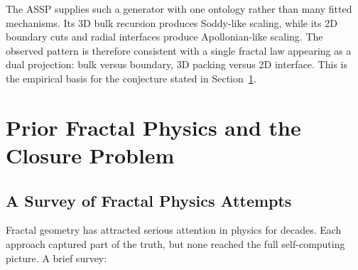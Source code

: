 \documentclass[11pt,a4paper]{article}
\begin{document}
The ASSP supplies such a generator with one ontology rather than many fitted mechanisms. Its 3D bulk recursion produces Soddy-like scaling, while its 2D boundary cuts and radial interfaces produce Apollonian-like scaling. The observed pattern is therefore consistent with a single fractal law appearing as a dual projection: bulk versus boundary, 3D packing versus 2D interface. This is the empirical basis for the conjecture stated in Section~\ref{sec:conjecture}.


\section{Prior Fractal Physics and the Closure Problem}
\label{sec:conjecture}

\subsection{A Survey of Fractal Physics Attempts}

Fractal geometry has attracted serious attention in physics for decades. Each approach captured part of the truth, but none reached the full self-computing picture. A brief survey:
\end{document}
